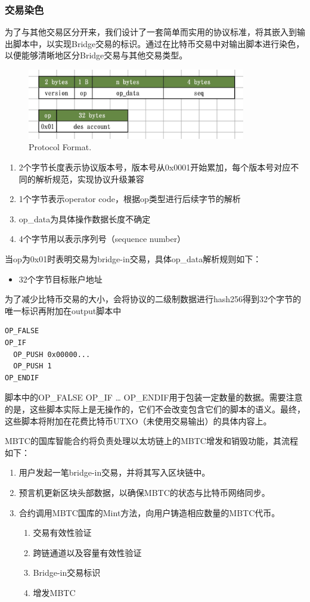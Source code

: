 \documentclass{article}
\begin{document}
\subsubsection{交易染色}
\par 为了与其他交易区分开来，我们设计了一套简单而实用的协议标准，将其嵌入到输出脚本中，以实现Bridge交易的标识。通过在比特币交易中对输出脚本进行染色，以便能够清晰地区分Bridge交易与其他交易类型。
\begin{figure}[h]
\centering
\includegraphics[width=0.85\textwidth]{bytes.jpg}
\caption{\label{fig:bytes}Protocol Format.}
\end{figure}
\begin{enumerate}
    \item 2个字节长度表示协议版本号，版本号从0x0001开始累加，每个版本号对应不同的解析规范，实现协议升级兼容
    \item 1个字节表示operator code，根据op类型进行后续字节的解析
    \item op\_data为具体操作数据长度不确定
    \item 4个字节用以表示序列号（sequence number）
\end{enumerate}
\par 当op为0x01时表明交易为bridge-in交易，具体op\_data解析规则如下：
\begin{itemize}
    \item 32个字节目标账户地址
\end{itemize}
\par 为了减少比特币交易的大小，会将协议的二级制数据进行hash256得到32个字节的唯一标识再附加在output脚本中
\begin{verbatim}
OP_FALSE
OP_IF
  OP_PUSH 0x00000...
  OP_PUSH 1
OP_ENDIF
\end{verbatim}
\par 脚本中的OP\_FALSE OP\_IF … OP\_ENDIF用于包装一定数量的数据。需要注意的是，这些脚本实际上是无操作的，它们不会改变包含它们的脚本的语义。最终，这些脚本将附加在花费比特币UTXO（未使用交易输出）的具体内容上。
\par MBTC的国库智能合约将负责处理以太坊链上的MBTC增发和销毁功能，其流程如下：
\begin{enumerate}
    \item 用户发起一笔bridge-in交易，并将其写入区块链中。
    \item 预言机更新区块头部数据，以确保MBTC的状态与比特币网络同步。
    \item 合约调用MBTC国库的Mint方法，向用户铸造相应数量的MBTC代币。
    \begin{enumerate}
        \item 交易有效性验证
        \item 跨链通道以及容量有效性验证
        \item Bridge-in交易标识
        \item 增发MBTC
    \end{enumerate}
\end{enumerate}
\end{document}
